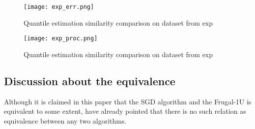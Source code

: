 \begin{figure}[h!]
    \centering
	\texttt{[image: exp\_err.png]}
    \caption{Quantile estimation similarity comparison on dataset from exp}
    \label{fig: exp_err}
\end{figure}

\begin{figure}[h!]
    \centering
	\texttt{[image: exp\_proc.png]}
    \caption{Quantile estimation similarity comparison on dataset from exp}
    \label{fig: exp_proc}
\end{figure}

\subsection{Discussion about the equivalence}
Although it is claimed in this paper that the SGD algorithm and the Frugal-1U is equivalent to some extent, \citeauthor{blassWhenAreTwo2008}\cite{blassWhenAreTwo2008} have already pointed that there is no such relation as equivalence between any two algorithms. 




